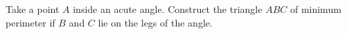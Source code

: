 Take a point $A$ inside an acute angle. Construct the triangle $ABC$ of minimum perimeter if $B$ and $C$ lie on the legs of the angle.
